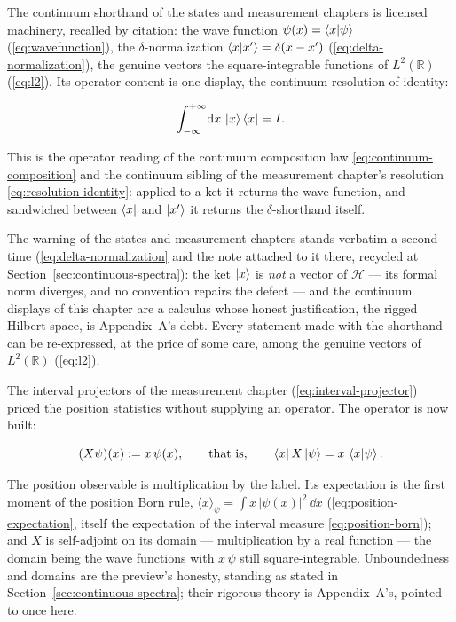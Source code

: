 The continuum shorthand of the states and measurement chapters is licensed machinery, recalled by citation: the wave function $\psi(x) = \braket{x|\psi}$ (\eqref{eq:wavefunction}), the $\delta$-normalization $\braket{x|x'} = \delta(x - x')$ (\eqref{eq:delta-normalization}), the genuine vectors the square-integrable functions of $L^2(\mathbb{R})$ (\eqref{eq:l2}). Its operator content is one display, the continuum resolution of identity:
\begin{linenomath}
    \begin{equation}
        \int_{-\infty}^{+\infty}\!\mathrm{d} x\,\ket{x}\bra{x} = I .
        \label{eq:position-resolution}
    \end{equation}
\end{linenomath}
This is the operator reading of the continuum composition law \eqref{eq:continuum-composition} and the continuum sibling of the measurement chapter's resolution \eqref{eq:resolution-identity}: applied to a ket it returns the wave function, and sandwiched between $\bra{x}$ and $\ket{x'}$ it returns the $\delta$-shorthand itself.

\begin{note}
The warning of the states and measurement chapters stands verbatim a second time (\eqref{eq:delta-normalization} and the note attached to it there, recycled at Section~\ref{sec:continuous-spectra}): the ket $\ket{x}$ is \emph{not} a vector of $\mathcal{H}$ --- its formal norm diverges, and no convention repairs the defect --- and the continuum displays of this chapter are a calculus whose honest justification, the rigged Hilbert space, is Appendix~A's debt. Every statement made with the shorthand can be re-expressed, at the price of some care, among the genuine vectors of $L^2(\mathbb{R})$ (\eqref{eq:l2}).
\end{note}

The interval projectors of the measurement chapter (\eqref{eq:interval-projector}) priced the position statistics without supplying an operator. The operator is now built:
\begin{linenomath}
    \begin{equation}
        (X\psi)(x) := x\,\psi(x), \qquad\text{that is,}\qquad \bra{x}X\ket{\psi} = x\,\braket{x|\psi} .
        \label{eq:x-multiplication}
    \end{equation}
\end{linenomath}
The position observable is multiplication by the label. Its expectation is the first moment of the position Born rule, $\langle x\rangle_\psi = \int\!x\,|\psi(x)|^2\,\dd x$ (\eqref{eq:position-expectation}, itself the expectation of the interval measure \eqref{eq:position-born}); and $X$ is self-adjoint on its domain --- multiplication by a real function --- the domain being the wave functions with $x\,\psi$ still square-integrable. Unboundedness and domains are the preview's honesty, standing as stated in Section~\ref{sec:continuous-spectra}; their rigorous theory is Appendix~A's, pointed to once here.

